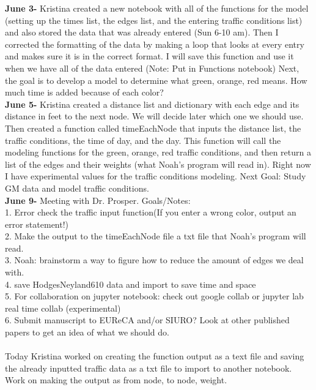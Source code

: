 \documentclass{article}
\begin{document}
\textbf{June 3-} Kristina created a new notebook with all of the functions for the model (setting up the times list, the edges list, and the entering traffic conditions list) and also stored the data that was already entered (Sun 6-10 am). Then I corrected the formatting of the data by making a loop that looks at every entry and makes sure it is in the correct format. I will save this function and use it when we have all of the data entered (Note: Put in Functions notebook) Next, the goal is to develop a model to determine what green, orange, red means. How much time is added because of each color? \\

\textbf{June 5-} Kristina created a distance list and dictionary with each edge and its distance in feet to the next node. We will decide later which one we should use. Then created a function called timeEachNode that inputs the distance list, the traffic conditions, the time of day, and the day. This function will call the modeling functions for the green, orange, red traffic conditions, and then return a list of the edges and their weights (what Noah's program will read in). Right now I have experimental values for the traffic conditions modeling. Next Goal: Study GM data and model traffic conditions. \\

\textbf{June 9-} Meeting with Dr. Prosper. Goals/Notes: \\
1. Error check the traffic input function(If you enter a wrong color, output an error statement!) \\
2. Make the output to the timeEachNode file a txt file that Noah's program will read. \\
3. Noah: brainstorm a way to figure how to reduce the amount of edges we deal with. \\
4. save HodgesNeyland610 data and import to save time and space \\
5. For collaboration on jupyter notebook: check out google collab or jupyter lab real time collab (experimental) \\
6. Submit manuscript to EUReCA and/or SIURO? Look at other published papers to get an idea of what we should do. \\
\\
Today Kristina worked on creating the function output as a text file and saving the already inputted traffic data as a txt file to import to another notebook. Work on making the output as from node, to node, weight. \\
\end{document}
